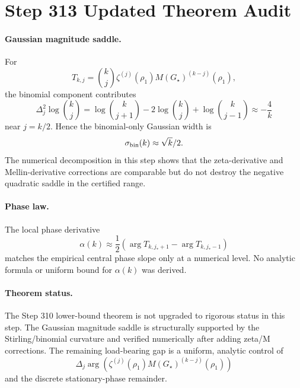 \section*{Step 313 Updated Theorem Audit}

\paragraph{Gaussian magnitude saddle.}
For
\[
T_{k,j}={k\choose j}\zeta^{(j)}(\rho_1)M(G_\star)^{(k-j)}(\rho_1),
\]
the binomial component contributes
\[
\Delta_j^2 \log {k\choose j}
=
\log {k\choose j+1}-2\log {k\choose j}+\log {k\choose j-1}
\approx -\frac{4}{k}
\]
near \(j=k/2\).  Hence the binomial-only Gaussian width is
\[
\sigma_{\rm bin}(k)\approx \sqrt{k}/2.
\]
The numerical decomposition in this step shows that the zeta-derivative
and Mellin-derivative corrections are comparable but do not destroy the
negative quadratic saddle in the certified range.

\paragraph{Phase law.}
The local phase derivative
\[
\alpha(k)\approx \frac12\left(\arg T_{k,j_\ast+1}-\arg T_{k,j_\ast-1}\right)
\]
matches the empirical central phase slope only at a numerical level.
No analytic formula or uniform bound for \(\alpha(k)\) was derived.

\paragraph{Theorem status.}
The Step 310 lower-bound theorem is not upgraded to rigorous status in
this step.  The Gaussian magnitude saddle is structurally supported by
the Stirling/binomial curvature and verified numerically after adding
zeta/M corrections.  The remaining load-bearing gap is a uniform,
analytic control of
\[
\Delta_j \arg\left(\zeta^{(j)}(\rho_1)M(G_\star)^{(k-j)}(\rho_1)\right)
\]
and the discrete stationary-phase remainder.
